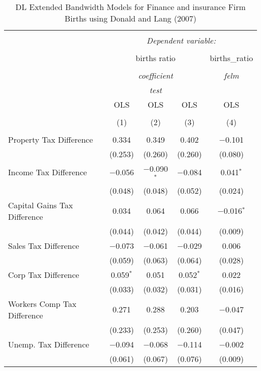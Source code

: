 
\begin{table}[!htbp] \centering 
  \caption{DL Extended Bandwidth Models for  Finance and insurance Firm Births using Donald and Lang (2007)} 
  \label{} 
\begin{tabular}{@{\extracolsep{5pt}}lcccc} 
\\[-1.8ex]\hline 
\hline \\[-1.8ex] 
 & \multicolumn{4}{c}{\textit{Dependent variable:}} \\ 
\cline{2-5} 
\\[-1.8ex] & \multicolumn{3}{c}{births ratio} & births\_ratio \\ 
\\[-1.8ex] & \multicolumn{3}{c}{\textit{coefficient}} & \textit{felm} \\ 
 & \multicolumn{3}{c}{\textit{test}} & \textit{} \\ 
 & OLS & OLS & OLS & OLS \\ 
\\[-1.8ex] & (1) & (2) & (3) & (4)\\ 
\hline \\[-1.8ex] 
 Property Tax Difference & 0.334 & 0.349 & 0.402 & $-$0.101 \\ 
  & (0.253) & (0.260) & (0.260) & (0.080) \\ 
  Income Tax Difference & $-$0.056 & $-$0.090$^{*}$ & $-$0.084 & 0.041$^{*}$ \\ 
  & (0.048) & (0.048) & (0.052) & (0.024) \\ 
  Capital Gains Tax Difference & 0.034 & 0.064 & 0.066 & $-$0.016$^{*}$ \\ 
  & (0.044) & (0.042) & (0.044) & (0.009) \\ 
  Sales Tax Difference & $-$0.073 & $-$0.061 & $-$0.029 & 0.006 \\ 
  & (0.059) & (0.063) & (0.064) & (0.028) \\ 
  Corp Tax Difference & 0.059$^{*}$ & 0.051 & 0.052$^{*}$ & 0.022 \\ 
  & (0.033) & (0.032) & (0.031) & (0.016) \\ 
  Workers Comp Tax Difference & 0.271 & 0.288 & 0.203 & $-$0.047 \\ 
  & (0.233) & (0.253) & (0.260) & (0.047) \\ 
  Unemp. Tax Difference & $-$0.094 & $-$0.068 & $-$0.114 & $-$0.002 \\ 
  & (0.061) & (0.067) & (0.076) & (0.009) \\ 

\end{tabular}
\end{table}
